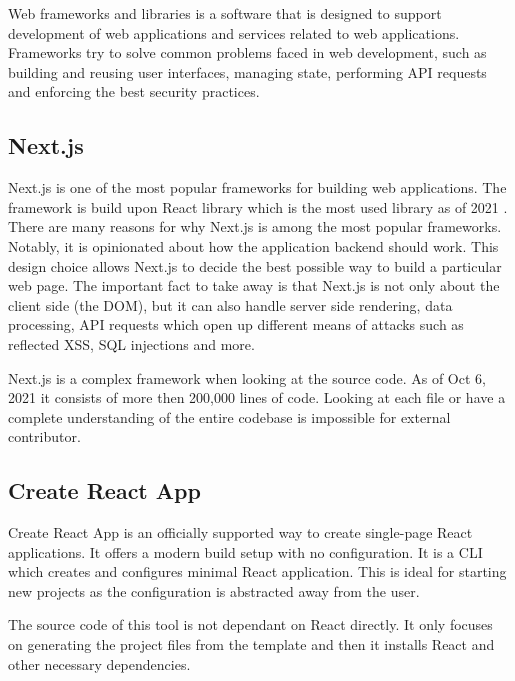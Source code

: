Web frameworks and libraries is a software that is designed to support development of web
applications and services related to web applications. Frameworks try to solve common problems faced
in web development, such as building and reusing user interfaces, managing state, performing API
requests and enforcing the best security practices.

\subsection{Next.js}
\label{intro-nextjs}

Next.js is one of the most popular frameworks for building web applications. The framework is build
upon React library which is the most used library as of 2021 \cite{react_most_used_2021}. There are
many reasons for why Next.js is among the most popular frameworks. Notably, it is opinionated about
how the application backend should work. This design choice allows Next.js to decide the best
possible way to build a particular web page. The important fact to take away is that Next.js is not
only about the client side (the DOM), but it can also handle server side rendering, data processing,
API requests which open up different means of attacks such as reflected XSS, SQL injections and
more.

Next.js is a complex framework when looking at the source code. As of Oct 6, 2021 it consists of
more then 200,000 lines of code. Looking at each file or have a complete understanding of the
entire codebase is impossible for external contributor.

\subsection{Create React App}
\label{intro-cra}

Create React App is an officially supported way to create single-page React applications. It offers
a modern build setup with no configuration. It is a CLI which creates and configures minimal React
application. This is ideal for starting new projects as the configuration is abstracted away from
the user.

The source code of this tool is not dependant on React directly. It only focuses on generating the
project files from the template and then it installs React and other necessary dependencies.
